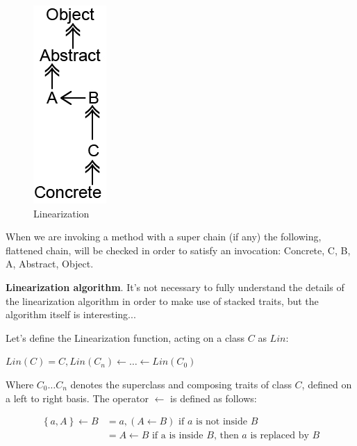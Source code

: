 \documentclass[conc-doc]{subfiles}
\begin{document}
\begin{figure}[H]%
	{
		\includegraphics[width=.15\textwidth]{images/linear2.jpg}
		\caption{Linearization}
	}
\end{figure}



When we are invoking a method with a super chain (if any) the following, flattened chain, will be checked in order to satisfy an invocation: Concrete, C, B, A, Abstract, Object.

\textbf{Linearization algorithm}. It's not necessary to fully understand the details of the linearization algorithm in order to make use of stacked traits, but the algorithm itself is interesting...

Let's define the Linearization function, acting on a class $C$ as $Lin$:

\begin{center}
	$Lin(C) = C, Lin(C_n) \leftarrow \dots \leftarrow Lin(C_0)$
\end{center}

Where $C_0 \dots C_n$ denotes the superclass and composing traits of class $C$, defined on a left to right basis. The operator $\leftarrow$ is defined as follows:

\begin{center}
	\begin{align*}
		\left \{a, A \right \} \leftarrow B &= a, (A \leftarrow B) \text{ if } a \text{ is not inside } B\\
		&= A \leftarrow B \text{ if a is inside } B\text{, then } a \text{ is replaced by } B
	\end{align*}
\end{center}
\end{document}
